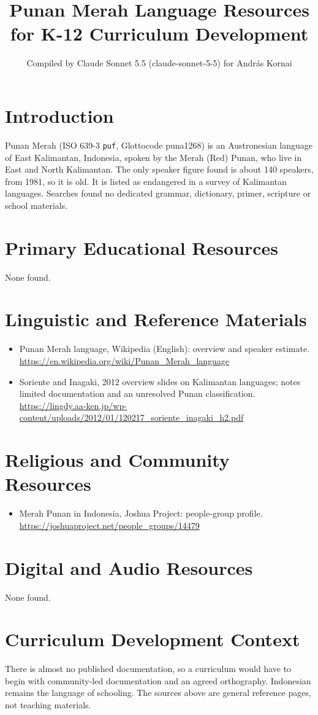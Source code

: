 \documentclass[12pt]{article}
\title{Punan Merah Language Resources for K-12 Curriculum Development}
\author{Compiled by Claude Sonnet 5.5 (claude-sonnet-5-5) for Andr\'as Kornai}
\date{}
\begin{document}
\maketitle

\section{Introduction}
Punan Merah (ISO 639-3 \texttt{puf}, Glottocode puna1268) is an Austronesian language of East Kalimantan, Indonesia, spoken by the Merah (Red) Punan, who live in East and North Kalimantan. The only speaker figure found is about 140 speakers, from 1981, so it is old. It is listed as endangered in a survey of Kalimantan languages. Searches found no dedicated grammar, dictionary, primer, scripture or school materials.

\section{Primary Educational Resources}
None found.

\section{Linguistic and Reference Materials}
\begin{itemize}
\item Punan Merah language, Wikipedia (English): overview and speaker estimate. \url{https://en.wikipedia.org/wiki/Punan_Merah_language}
\item Soriente and Inagaki, 2012 overview slides on Kalimantan languages; notes limited documentation and an unresolved Punan classification. \url{https://lingdy.aa-ken.jp/wp-content/uploads/2012/01/120217_soriente_inagaki_h2.pdf}
\end{itemize}

\section{Religious and Community Resources}
\begin{itemize}
\item Merah Punan in Indonesia, Joshua Project: people-group profile. \url{https://joshuaproject.net/people_groups/14479}
\end{itemize}

\section{Digital and Audio Resources}
None found.

\section{Curriculum Development Context}
There is almost no published documentation, so a curriculum would have to begin with community-led documentation and an agreed orthography. Indonesian remains the language of schooling. The sources above are general reference pages, not teaching materials.
\end{document}
